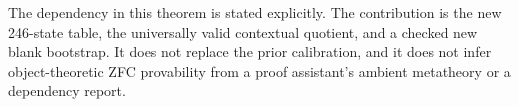 \documentclass[11pt]{article}
\begin{document}
The dependency in this theorem is stated explicitly. The contribution
is the new 246-state table, the universally valid contextual quotient,
and a checked new blank bootstrap. It does not replace the prior
calibration, and it does not infer object-theoretic ZFC provability from
a proof assistant's ambient metatheory or a dependency report.
\end{document}
